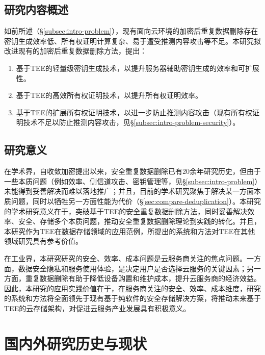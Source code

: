 \subsection{研究内容概述}
\label{subsec:intro-target}

如前所述（\S\ref{subsec:intro-problem}），现有面向云环境的加密后重复数据删除存在密钥生成效率低、所有权证明计算复杂、易于遭受推测内容攻击等不足。本研究拟改进现有的加密后重复数据删除方法，提出：

\begin{enumerate}
    \item 基于TEE的轻量级密钥生成技术，以提升服务器辅助密钥生成的效率和可扩展性。
    \item 基于TEE的高效所有权证明技术，以提升所有权证明效率。
    \item 基于TEE的扩展所有权证明技术，以进一步防止推测内容攻击（现有所有权证明技术不足以防止推测内容攻击，见\S\ref{subsec:intro-problem-security}）。
\end{enumerate}

\subsection{研究意义}
\label{subsec:intro-meaning}

在学术界，自收敛加密\cite{douceur02}提出以来，安全重复数据删除已有20余年研究历史，但由于一些本质问题（例如效率、侧信道攻击、密钥管理等，见\S\ref{subsec:intro-problem}）未能得到妥善解决而难以落地推广；并且，目前的学术研究聚焦于解决某一方面本质问题，同时以牺牲另一方面性能为代价（\S\ref{sec:compare-deduplication}）。本研究的学术研究意义在于，突破基于TEE的安全重复数据删除方法，同时妥善解决效率、安全、存储多个本质问题，推动安全重复数据删除理论到实践的转化。并且，本研究作为TEE在数据存储领域的应用范例，所提出的系统和方法对TEE在其他领域研究具有参考价值。

在工业界，本研究研究的安全、效率、成本问题是云服务商关注的焦点问题。一方面，数据安全隐私和服务使用体验，是决定用户是否选择云服务的关键因素；另一方面，重复数据删除有助于降低设备购置和维护成本，提升云服务商的经济效益。因此，本研究的应用实践价值在于，在服务商关注的安全、效率、成本维度，研究的系统和方法将全面领先于现有基于纯软件的安全存储解决方案，将推动未来基于TEE的云存储架构，对促进云服务产业发展具有积极意义。

\section{国内外研究历史与现状}
\label{sec:compare}

